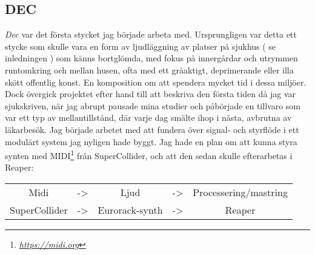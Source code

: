 \documentclass{article}
\begin{document}


\subsection{DEC}
\emph{Dec} var det första stycket jag började arbeta med. Ursprungligen var detta ett stycke som skulle
vara en form av ljudläggning av platser på sjukhus ( se inledningen ) som känns bortglömda, med fokus på
innergårdar och utrymmen runtomkring och mellan husen, ofta med ett gråaktigt, deprimerande eller illa
skött offentlig konst. En komposition om att spendera mycket tid i dessa miljöer. Dock övergick projektet
efter hand till att beskriva den första tiden då jag var sjukskriven, när jag abrupt pausade mina studier
och påbörjade en tillvaro som var ett typ av mellantillstånd, där varje dag smälte ihop i nästa, avbrutna
av läkarbesök.
Jag började arbetet med att fundera över signal- och styrflöde i ett modulärt system jag nyligen hade
byggt. Jag hade en plan om att kunna styra synten med MIDI\footnote{\emph{\url{https://midi.org}}} från SuperCollider, och att
den sedan skulle efterarbetas i Reaper:
\begin{center}
	\begin{tabular}{ c c c c c }
		Midi		  & -> & Ljud			& -> & Processering/mastring \\
		SuperCollider & -> & Eurorack-synth & -> & Reaper
	\end{tabular}
\end{center}
\end{document}
